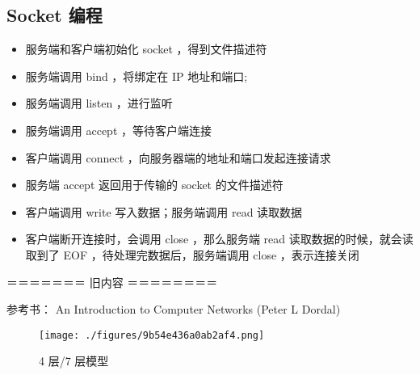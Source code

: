 \subsection{Socket 编程}
\begin{itemize}
\item 服务端和客户端初始化      socket  ，得到文件描述符
\item 服务端调用      bind  ，将绑定在 IP 地址和端口;
\item 服务端调用      listen  ，进行监听
\item 服务端调用      accept  ，等待客户端连接
\item 客户端调用      connect  ，向服务器端的地址和端口发起连接请求
\item 服务端      accept   返回用于传输的      socket   的文件描述符
\item 客户端调用      write   写入数据；服务端调用      read   读取数据
\item 客户端断开连接时，会调用      close  ，那么服务端      read   读取数据的时候，就会读取到了 EOF  ，待处理完数据后，服务端调用      close  ，表示连接关闭
\end{itemize}


＝＝＝＝＝＝＝ 旧内容 ＝＝＝＝＝＝＝＝

参考书： An Introduction to Computer Networks (Peter L Dordal)

\begin{figure}[ht]
\centering
\texttt{[image: ./figures/9b54e436a0ab2af4.png]}
\caption{4 层/7 层模型} \label{fig_NetNt_1}
\end{figure}


